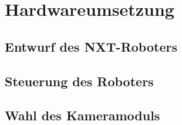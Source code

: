 \chapter{Hardwareumsetzung}
\section{Entwurf des NXT-Roboters}
\section{Steuerung des Roboters}
\section{Wahl des Kameramoduls}